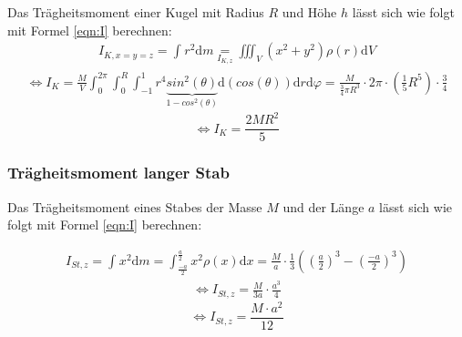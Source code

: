 Das Trägheitsmoment einer Kugel mit Radius $R$ und Höhe $h$ lässt sich wie folgt mit Formel \ref{eqn:I} berechnen:
\begin{align*}
    I_{K,x=y=z} = \int_{}^{}r^2 \mathrm{d}m \underset{I_{K,z}}{=} \iiint_{V}^{} (x^2 + y^2) \rho(r) \mathrm{d}V    
\end{align*}
\begin{align*}
    \Leftrightarrow I_K = \frac{M}{V} \int_{0}^{2\pi} \int_{0}^{R} \int_{-1}^{1}r^4 \underbrace{sin^2(\theta)}_{\text{$1 - cos^2(\theta)$}}  \mathrm{d}(cos(\theta)) \mathrm{d}r \mathrm{d}\varphi = \frac{M}{\frac{3}{4} \pi R^3} \cdot 2\pi \cdot \left(\frac{1}{5}R^5 \right) \cdot \frac{3}{4} 
\end{align*}
\begin{equation}
    \Leftrightarrow I_K = \frac{2MR^2}{5}
\end{equation}

\subsubsection{Trägheitsmoment langer Stab}

Das Trägheitsmoment eines Stabes der Masse $M$ und der Länge $a$ lässt sich wie folgt mit Formel \ref{eqn:I} berechnen:

\begin{align*}
    I_{St,z} = \int_{}^{}x^2 \mathrm{d}m = \int_{\frac{-a}{2}}^{\frac{a}{2}} x^2 \rho(x) \mathrm{d}x = \frac{M}{a} \cdot \frac{1}{3} \left( \left(\frac{a}{2} \right)^3 - \left(\frac{-a}{2} \right)^3 \right)
\end{align*}
\begin{align*}
    \Leftrightarrow I_{St,z} = \frac{M}{3a} \cdot \frac{a^3}{4}
\end{align*}
\begin{equation}
    \Leftrightarrow I_{St,z} = \frac{M \cdot a^2}{12}
\end{equation}
\newpage